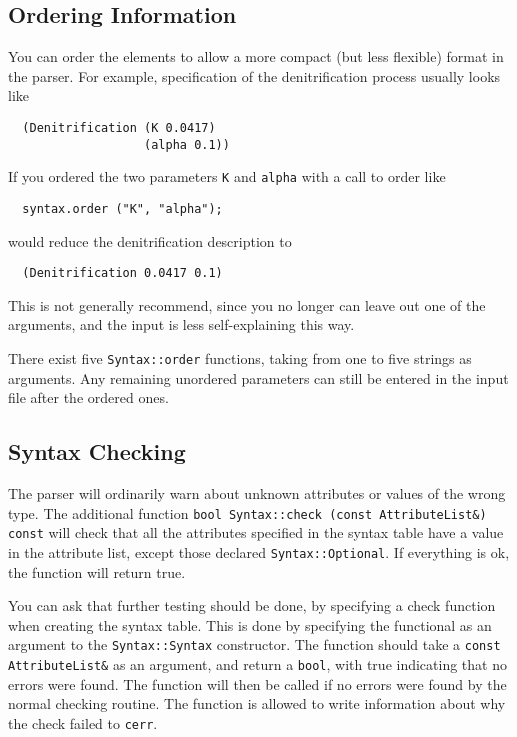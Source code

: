 \documentclass{article}
\newcommand{\code}[1]{\texttt{#1}}
\begin{document}
\subsection{Ordering Information}

You can order the elements to allow a more compact (but less
flexible) format in the parser.  For example, specification of the
denitrification process usually looks like
\begin{verbatim}
  (Denitrification (K 0.0417)
                   (alpha 0.1))
\end{verbatim}
If you ordered the two parameters \code{K} and \code{alpha} with a call to
order like
\begin{verbatim}
  syntax.order ("K", "alpha");
\end{verbatim}
would reduce the denitrification description to
\begin{verbatim}
  (Denitrification 0.0417 0.1)
\end{verbatim}
This is not generally recommend, since you no longer can leave out one
of the arguments, and the input is less self-explaining this way.

There exist five \code{Syntax::order} functions, taking from one to
five strings as arguments.  Any remaining unordered parameters can
still be entered in the input file after the ordered ones.

\subsection{Syntax Checking}

The parser will ordinarily warn about unknown attributes or values of
the wrong type.  The additional function 
\code{bool Syntax::check (const AttributeList\&) const} will check
that all the attributes specified in the syntax table have a value in
the attribute list, except those declared \code{Syntax::Optional}.  If
everything is ok, the function will return true.

You can ask that further testing should be done, by specifying a check
function when creating the syntax table.  This is done by specifying
the functional as an argument to the \code{Syntax::Syntax}
constructor.  The function should take a \code{const AttributeList\&}
as an argument, and return a \code{bool}, with true indicating that no
errors were found.  The function will then be called if no errors were
found by the normal checking routine.  The function is allowed to write
information about why the check failed to \code{cerr}.
\end{document}
